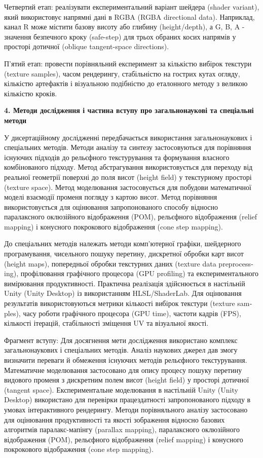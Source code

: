 \documentclass[14pt,a4paper]{extarticle}
\newcommand{\eng}[1]{\foreignlanguage{english}{#1}}
\newcommand{\sectiontitle}[1]{%
  \par\vspace{\baselineskip}%
  \noindent\textbf{#1}\par
}
\begin{document}
Четвертий етап: реалізувати експериментальний варіант шейдера (\eng{shader variant}), який використовує напрямні дані в RGBA (\eng{RGBA directional data}). Наприклад, канал R може містити базову висоту або глибину (\eng{height/depth}), а G, B, A - значення безпечного кроку (\eng{safe-step}) для трьох обраних косих напрямів у просторі дотичної (\eng{oblique tangent-space directions}).

П'ятий етап: провести порівняльний експеримент за кількістю вибірок текстури (\eng{texture samples}), часом рендерингу, стабільністю на гострих кутах огляду, кількістю артефактів і візуальною подібністю до еталонного методу з великою кількістю кроків.

\sectiontitle{4. Методи дослідження і частина вступу про загальнонаукові та спеціальні методи}

У дисертаційному дослідженні передбачається використання загальнонаукових і спеціальних методів. Методи аналізу та синтезу застосовуються для порівняння існуючих підходів до рельєфного текстурування та формування власного комбінованого підходу. Метод абстрагування використовується для переходу від реальної геометрії поверхні до поля висот (\eng{height field}) у текстурному просторі (\eng{texture space}). Метод моделювання застосовується для побудови математичної моделі взаємодії променя погляду з картою висот. Метод порівняння використовується для оцінювання запропонованого способу відносно паралаксного оклюзійного відображення (POM), рельєфного відображення (\eng{relief mapping}) і конусного покрокового відображення (\eng{cone step mapping}).

До спеціальних методів належать методи комп'ютерної графіки, шейдерного програмування, чисельного пошуку перетину, дискретної обробки карт висот (\eng{height maps}), попередньої обробки текстурних даних (\eng{texture data preprocessing}), профілювання графічного процесора (\eng{GPU profiling}) та експериментального вимірювання продуктивності. Практична реалізація здійснюється в настільній Unity (\eng{Unity Desktop}) із використанням HLSL/ShaderLab. Для оцінювання результатів використовуються метрики кількості вибірок текстури (\eng{texture samples}), часу роботи графічного процесора (\eng{GPU time}), частоти кадрів (FPS), кількості ітерацій, стабільності зміщення UV та візуальної якості.

Фрагмент вступу: Для досягнення мети дослідження використано комплекс загальнонаукових і спеціальних методів. Аналіз наукових джерел дав змогу визначити переваги й обмеження існуючих методів рельєфного текстурування. Математичне моделювання застосовано для опису процесу пошуку перетину видового променя з дискретним полем висот (\eng{height field}) у просторі дотичної (\eng{tangent space}). Експериментальне моделювання в настільній Unity (\eng{Unity Desktop}) використано для перевірки працездатності запропонованого підходу в умовах інтерактивного рендерингу. Методи порівняльного аналізу застосовано для оцінювання продуктивності та якості зображення відносно базових алгоритмів паралакс-мапінгу (\eng{parallax mapping}), паралаксного оклюзійного відображення (POM), рельєфного відображення (\eng{relief mapping}) і конусного покрокового відображення (\eng{cone step mapping}).
\end{document}
